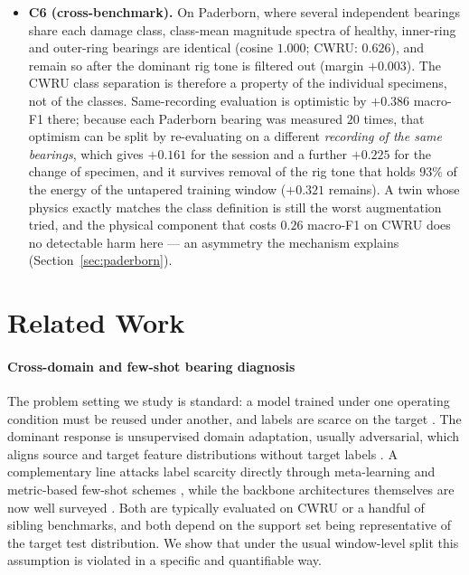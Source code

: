 \documentclass[preprint,12pt]{elsarticle}
\begin{document}
\begin{itemize}
transfers into load~3 at $0.69$--$0.80$. Conclusions drawn from the popular
S0$\rightarrow$S3 direction alone do not generalize
(Section~\ref{sec:protocol}).
\item \textbf{C6 (cross-benchmark).} On Paderborn, where several independent
bearings share each damage class, class-mean magnitude spectra of healthy,
inner-ring and outer-ring bearings are identical (cosine $1.000$; CWRU:
$0.626$), and remain so after the dominant rig tone is filtered out (margin
$+0.003$). The CWRU class separation is therefore a property of the individual
specimens, not of the classes. Same-recording evaluation is optimistic by
$+0.386$ macro-F1 there; because each Paderborn bearing was measured $20$
times, that optimism can be split by re-evaluating on a different
\emph{recording of the same bearings}, which gives $+0.161$ for the session
and a further $+0.225$ for the change of specimen, and it survives removal of
the rig tone that holds $93\%$ of the energy of the untapered training window
($+0.321$ remains). A twin whose physics
exactly matches the class definition is still the worst augmentation tried, and
the physical component that costs $0.26$ macro-F1 on CWRU does no detectable
harm here --- an asymmetry the mechanism explains
(Section~\ref{sec:paderborn}).
\end{itemize}

\section{Related Work}
\label{sec:related}

\paragraph{Cross-domain and few-shot bearing diagnosis}
The problem setting we study is standard: a model trained under one operating
condition must be reused under another, and labels are scarce on the target
\cite{lei2020roadmap, zhao2020benchmark}. The dominant response is unsupervised
domain adaptation, usually adversarial, which aligns source and target feature
distributions without target labels \cite{ganin2016dann, wang2018dasurvey,
zhao2021transfer}. A complementary line
attacks label scarcity directly through meta-learning and metric-based few-shot
schemes \cite{wang2020fewshot}, while the backbone architectures themselves are
now well surveyed \cite{jiao2020cnn}. Both are typically evaluated on CWRU or a
handful of sibling benchmarks, and both depend on the support set being
representative of the target test distribution. We show that under the usual
window-level split this assumption is violated in a specific and quantifiable
way.
\end{document}
